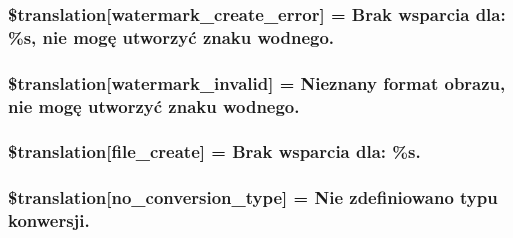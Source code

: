 \subsubsection[{\$translation}]{\setlength{\rightskip}{0pt plus 5cm}\$translation\mbox{[}\textquotesingle{}watermark\+\_\+create\+\_\+error\textquotesingle{}\mbox{]} = \textquotesingle{}Brak wsparcia dla\+: \%s, nie mogę utworzyć znaku wodnego.\textquotesingle{}}\label{class_8upload_8pl___p_l_8php_aabca0b65dadbc6184415c16375f284ca}
\hypertarget{class_8upload_8pl___p_l_8php_ac336e7a5701e47ba4a05e9e498a3cc44}{}
\subsubsection[{\$translation}]{\setlength{\rightskip}{0pt plus 5cm}\$translation\mbox{[}\textquotesingle{}watermark\+\_\+invalid\textquotesingle{}\mbox{]} = \textquotesingle{}Nieznany format obrazu, nie mogę utworzyć znaku wodnego.\textquotesingle{}}\label{class_8upload_8pl___p_l_8php_ac336e7a5701e47ba4a05e9e498a3cc44}
\hypertarget{class_8upload_8pl___p_l_8php_a1ecb4673e4fb69e06b3f20b65cecf30a}{}
\subsubsection[{\$translation}]{\setlength{\rightskip}{0pt plus 5cm}\$translation\mbox{[}\textquotesingle{}file\+\_\+create\textquotesingle{}\mbox{]} = \textquotesingle{}Brak wsparcia dla\+: \%s.\textquotesingle{}}\label{class_8upload_8pl___p_l_8php_a1ecb4673e4fb69e06b3f20b65cecf30a}
\hypertarget{class_8upload_8pl___p_l_8php_a4712d7ec28e9a7f17eb3338af2358363}{}
\subsubsection[{\$translation}]{\setlength{\rightskip}{0pt plus 5cm}\$translation\mbox{[}\textquotesingle{}no\+\_\+conversion\+\_\+type\textquotesingle{}\mbox{]} = \textquotesingle{}Nie zdefiniowano typu konwersji.\textquotesingle{}}\label{class_8upload_8pl___p_l_8php_a4712d7ec28e9a7f17eb3338af2358363}
\hypertarget{class_8upload_8pl___p_l_8php_a783c9358bcf54a054545b50098bc679b}{}
